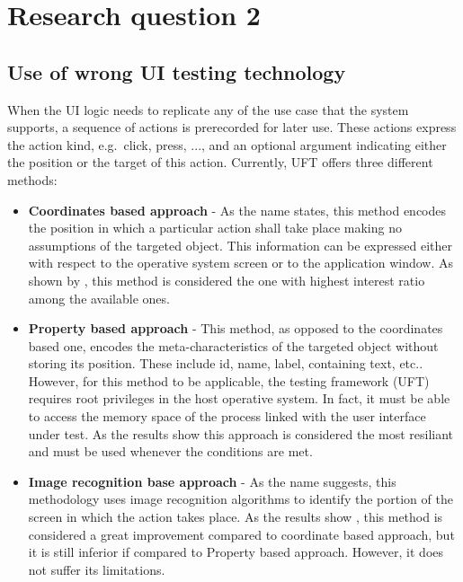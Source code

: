\section{Research question 2}

    \subsection{Use of wrong UI testing technology}

    When the UI logic needs to replicate any of the use case that the system supports, a sequence of actions is prerecorded for later use. These actions express the action kind, e.g.\ click, press, ..., and an optional argument indicating either the position or the target of this action. Currently, UFT offers three different methods:

\begin{itemize}

\item{\textbf{Coordinates based approach}} - As the name states, this method encodes the position in which a particular action shall take place making no assumptions of the targeted object. This information can be expressed either with respect to the operative system screen or to the application window. As shown by , this method is considered the one with highest interest ratio among the available ones.

\item{\textbf{Property based approach}} - This method, as opposed to the coordinates based one, encodes the meta-characteristics of the targeted object without storing its position. These include id, name, label, containing text, etc.. However, for this method to be applicable, the testing framework (UFT) requires root privileges in the host operative system. In fact, it must be able to access the memory space of the process linked with the user interface under test. As the results show  this approach is considered the most resiliant and must be used whenever the conditions are met.

\item{\textbf{Image recognition base approach}} - As the name suggests, this methodology uses image recognition algorithms to identify the portion of the screen in which the action takes place. As the results show , this method is considered a great improvement compared to coordinate based approach, but it is still inferior if compared to Property based approach. However, it does not suffer its limitations.

\end{itemize}

